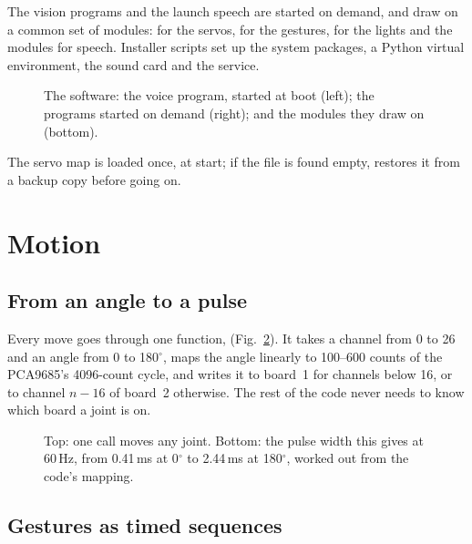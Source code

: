 \documentclass[11pt]{article}
\begin{document}
The vision programs and the launch speech are started on demand, and draw on a common set of modules:  for the servos,  for the gestures,  for the lights and the  modules for speech. Installer scripts set up the system packages, a Python virtual environment, the sound card and the service.

\begin{figure}[htbp]
  \centering
  \caption{The software: the voice program, started at boot (left); the programs started on demand (right); and the modules they draw on (bottom).}
  \label{fig:software}
\end{figure}

The servo map is loaded once, at start; if the file is found empty,  restores it from a backup copy before going on.

\section{Motion}
\label{sec:motion}

\subsection{From an angle to a pulse}

Every move goes through one function,  (Fig.~\ref{fig:chain}). It takes a channel from 0 to 26 and an angle from 0 to 180$^\circ$, maps the angle linearly to 100--600 counts of the PCA9685's 4096-count cycle, and writes it to board~1 for channels below 16, or to channel $n-16$ of board~2 otherwise. The rest of the code never needs to know which board a joint is on.

\begin{figure}[htbp]
  \centering
  \par\bigskip
  \caption{Top: one call moves any joint. Bottom: the pulse width this gives at 60\,Hz, from 0.41\,ms at 0$^\circ$ to 2.44\,ms at 180$^\circ$, worked out from the code's mapping.}
  \label{fig:chain}
\end{figure}

\subsection{Gestures as timed sequences}
\end{document}

